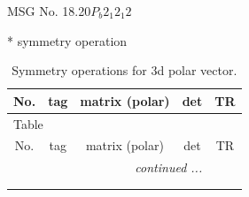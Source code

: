 \documentclass[fleqn,8pt]{jsarticle}
\begin{document}
\setcounter{MaxMatrixCols}{32}

\renewcommand{\tablename}{Table~}
\renewcommand{\figurename}{Figure~}
\begin{center}
\LARGE
MSG No. 18.20\quad$P_{b}2_{1}2_{1}2$
\end{center}
* symmetry operation
\renewcommand{\arraystretch}{1.3}
\begin{longtable}{ccccc}
\caption{Symmetry operations for 3d polar vector.}
 \\
 \hline \hline
No. & tag & matrix (polar) & det & TR \\ \hline \endfirsthead

\multicolumn{4}{l}{\tablename\ \thetable{}} \\
 \hline \hline
No. & tag & matrix (polar) & det & TR \\ \hline \endhead

 \hline \hline
\multicolumn{4}{r}{\footnotesize\it continued ...} \\ \endfoot

 \hline \hline
\multicolumn{4}{r}{} \\ \endlastfoot


\end{longtable}
\end{document}
